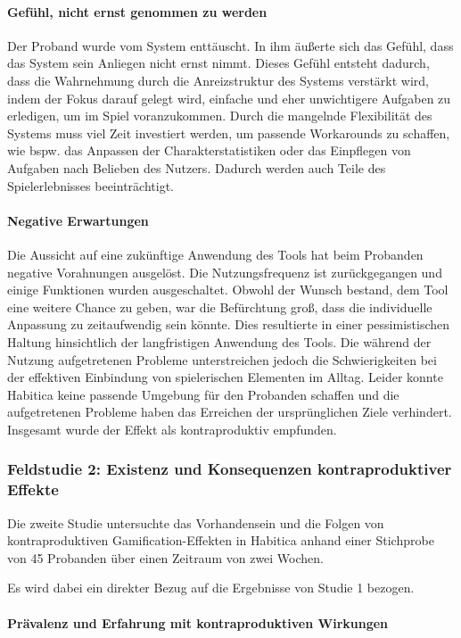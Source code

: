 \documentclass[sigconf, nonacm]{acmart}
\begin{document}
\paragraph{Gefühl, nicht ernst genommen zu werden}\label{sec:sr2}
Der Proband wurde vom System enttäuscht. In ihm äußerte sich das Gefühl, dass das System sein Anliegen nicht ernst nimmt. Dieses Gefühl entsteht dadurch, dass die Wahrnehmung durch die Anreizstruktur des Systems verstärkt wird, indem der Fokus darauf gelegt wird, einfache und eher unwichtigere Aufgaben zu erledigen, um im Spiel voranzukommen. 
Durch die mangelnde Flexibilität des Systems muss viel Zeit investiert werden, um passende Workarounds zu schaffen, wie bspw. das Anpassen der Charakterstatistiken oder das Einpflegen von Aufgaben nach Belieben des Nutzers. Dadurch werden auch Teile des Spielerlebnisses beeinträchtigt.

\paragraph{Negative Erwartungen}\label{sec:sr3}
Die Aussicht auf eine zukünftige Anwendung des Tools hat beim Probanden negative Vorahnungen ausgelöst. Die Nutzungsfrequenz ist zurückgegangen und einige Funktionen wurden ausgeschaltet. Obwohl der Wunsch bestand, dem Tool eine weitere Chance zu geben, war die Befürchtung groß, dass die individuelle Anpassung zu zeitaufwendig sein könnte. Dies resultierte in einer pessimistischen Haltung hinsichtlich der langfristigen Anwendung des Tools. Die während der Nutzung aufgetretenen Probleme unterstreichen jedoch die Schwierigkeiten bei der effektiven Einbindung von spielerischen Elementen im Alltag. Leider konnte Habitica keine passende Umgebung für den Probanden schaffen und die aufgetretenen Probleme haben das Erreichen der ursprünglichen Ziele verhindert. Insgesamt wurde der Effekt als kontraproduktiv empfunden.

\subsubsection{Feldstudie 2: Existenz und Konsequenzen kontraproduktiver Effekte}
Die zweite Studie untersuchte das Vorhandensein und die Folgen von kontraproduktiven Gamification-Effekten in Habitica anhand einer Stichprobe von 45 Probanden über einen Zeitraum von zwei Wochen.

Es wird dabei ein direkter Bezug auf die Ergebnisse von Studie 1 bezogen.

\paragraph{Prävalenz und Erfahrung mit kontraproduktiven Wirkungen}
\end{document}
